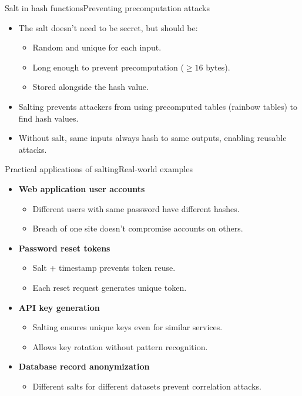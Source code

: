 \documentclass[aspectratio=169, lualatex, handout]{beamer}
\begin{document}
\begin{frame}{Salt in hash functions}{Preventing precomputation attacks}
	\begin{itemize}
		\item The salt doesn't need to be secret, but should be:
		      \begin{itemize}
			      \item Random and unique for each input.
			      \item Long enough to prevent precomputation ($\geq 16$ bytes).
			      \item Stored alongside the hash value.
		      \end{itemize}
		\item Salting prevents attackers from using precomputed tables (rainbow tables) to find hash values.
		\item Without salt, same inputs always hash to same outputs, enabling reusable attacks.
	\end{itemize}
\end{frame}

\begin{frame}{Practical applications of salting}{Real-world examples}
	\begin{itemize}
		\item \textbf{Web application user accounts}
		      \begin{itemize}
			      \item Different users with same password have different hashes.
			      \item Breach of one site doesn't compromise accounts on others.
		      \end{itemize}
		\item \textbf{Password reset tokens}
		      \begin{itemize}
			      \item Salt + timestamp prevents token reuse.
			      \item Each reset request generates unique token.
		      \end{itemize}
		\item \textbf{API key generation}
		      \begin{itemize}
			      \item Salting ensures unique keys even for similar services.
			      \item Allows key rotation without pattern recognition.
		      \end{itemize}
		\item \textbf{Database record anonymization}
		      \begin{itemize}
			      \item Different salts for different datasets prevent correlation attacks.
		      \end{itemize}
	\end{itemize}
\end{frame}
\end{document}
